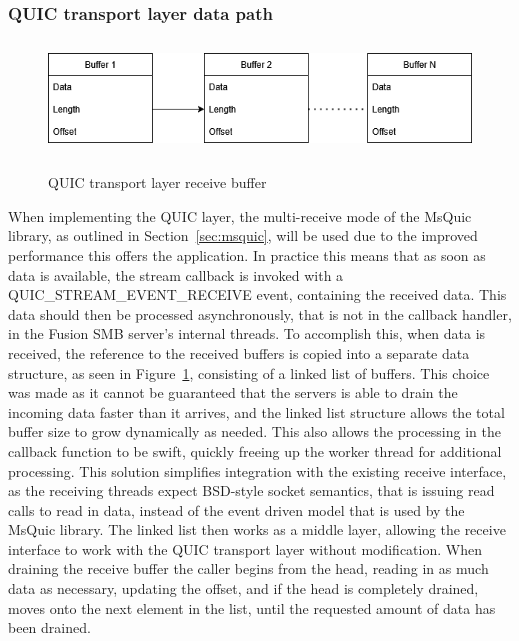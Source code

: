 \documentclass[english, 12pt, a4paper, elec, utf8, a-2b, online]{aaltothesis}
\begin{document}
\subsubsection{QUIC transport layer data path}
\begin{figure}[h]
	\centering
	\includegraphics[alt={Block diagram of the receive buffer of the QUIC layer}, height=3cm]{./images/quic_buffer.png}
	\caption{QUIC transport layer receive buffer}
	\label{fig:msquic_buf}
\end{figure}

When implementing the QUIC layer, the multi-receive mode of the MsQuic
library, as outlined in Section~\ref{sec:msquic}, will be used due to the improved performance
this offers the application. In practice this means that as soon as data is available,
the stream callback is invoked with a QUIC\_STREAM\_EVENT\_RECEIVE event, containing
the received data. This data should then be processed asynchronously, that is not in
the callback handler, in the Fusion SMB server's internal threads. To accomplish this,
when data is received, the reference to the received buffers is copied into a separate
data structure, as seen in Figure~\ref{fig:msquic_buf}, consisting of a linked list
of buffers. This choice was made as it cannot be guaranteed that the servers is able to drain 
the incoming data faster than it arrives, and the linked list structure allows
the total buffer size to grow dynamically as needed. This also allows the processing in the
callback function to be swift, quickly freeing up the worker thread for additional processing.
This solution simplifies integration with the existing receive interface, as the receiving threads
expect BSD-style socket semantics, that is issuing read calls to read in data, instead of the
event driven model that is used by the MsQuic library. The linked list then works as a middle
layer, allowing the receive interface to work with the QUIC transport layer without modification.
When draining the receive buffer the caller begins from the head, reading in as
much data as necessary, updating the offset, and if the head is completely drained,
moves onto the next element in the list, until the requested amount of data has
been drained.
\end{document}
